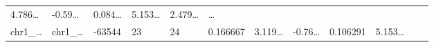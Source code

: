 \documentclass[
]{article}
\begin{document}
\begin{longtable}[]{@{}llllllllllll@{}}
\begin{minipage}[t]{0.08\columnwidth}
4.786\ldots{}\strut
\end{minipage} & \begin{minipage}[t]{0.06\columnwidth}\raggedright
-0.59\ldots{}\strut
\end{minipage} & \begin{minipage}[t]{0.06\columnwidth}\raggedright
0.084\ldots{}\strut
\end{minipage} & \begin{minipage}[t]{0.09\columnwidth}\raggedright
5.153\ldots{}\strut
\end{minipage} & \begin{minipage}[t]{0.06\columnwidth}\raggedright
2.479\ldots{}\strut
\end{minipage} & \begin{minipage}[t]{0.02\columnwidth}\raggedright
\ldots{}\strut
\end{minipage}\tabularnewline
\begin{minipage}[t]{0.06\columnwidth}\raggedright
chr1\_\ldots{}\strut
\end{minipage} & \begin{minipage}[t]{0.06\columnwidth}\raggedright
chr1\_\ldots{}\strut
\end{minipage} & \begin{minipage}[t]{0.06\columnwidth}\raggedright
-63544\strut
\end{minipage} & \begin{minipage}[t]{0.06\columnwidth}\raggedright
23\strut
\end{minipage} & \begin{minipage}[t]{0.06\columnwidth}\raggedright
24\strut
\end{minipage} & \begin{minipage}[t]{0.06\columnwidth}\raggedright
0.166667\strut
\end{minipage} & \begin{minipage}[t]{0.08\columnwidth}\raggedright
3.119\ldots{}\strut
\end{minipage} & \begin{minipage}[t]{0.06\columnwidth}\raggedright
-0.76\ldots{}\strut
\end{minipage} & \begin{minipage}[t]{0.06\columnwidth}\raggedright
0.106291\strut
\end{minipage} & \begin{minipage}[t]{0.09\columnwidth}\raggedright
5.153\ldots{}\strut
\end{minipage} & \begin{minipage}[t]{0.06\columnwidth}\raggedright

\end{minipage}
\end{longtable}
\end{document}
